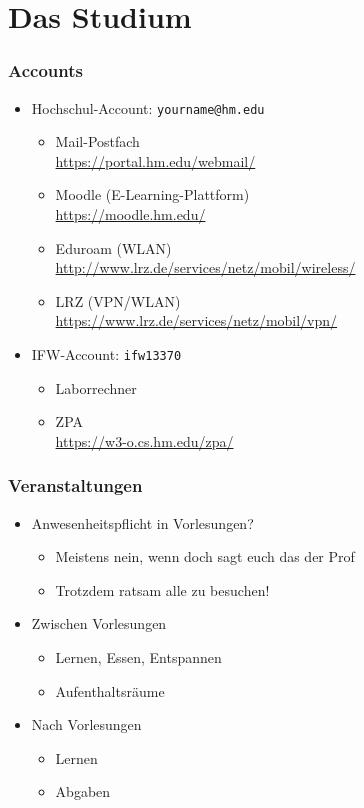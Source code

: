 \documentclass{beamer}
\begin{document}
\section{Das Studium}
\begin{frame}
\frametitle{Accounts}

\begin{itemize}
	\item Hochschul-Account: \texttt{yourname@hm.edu}
		\begin{itemize}
			\item Mail-Postfach\\
				\footnotesize\url{https://portal.hm.edu/webmail/}\small
			\pause
			\item Moodle (E-Learning-Plattform)\\
				\footnotesize\url{https://moodle.hm.edu/}\small
			\pause
			\item Eduroam (WLAN)\\
				\footnotesize\url{http://www.lrz.de/services/netz/mobil/wireless/}\small
			\pause
			\item LRZ (VPN/WLAN)\\
				\footnotesize\url{https://www.lrz.de/services/netz/mobil/vpn/}\small
		\end{itemize}
	\pause
	\item IFW-Account: \texttt{ifw13370}
		\begin{itemize}
			\item Laborrechner
			\pause
			\item ZPA\\
				\footnotesize\url{https://w3-o.cs.hm.edu/zpa/}\small
		\end{itemize}
\end{itemize}
\end{frame}


\begin{frame}
\frametitle{Veranstaltungen}
\begin{itemize}
	\item Anwesenheitspflicht in Vorlesungen?
		\begin{itemize}
			\item Meistens nein, wenn doch sagt euch das der Prof
			\item Trotzdem ratsam alle zu besuchen!
		\end{itemize}
	\pause
	\item Zwischen Vorlesungen
		\begin{itemize}
			\item Lernen, Essen, Entspannen
			\item Aufenthaltsräume
		\end{itemize}
	\pause
	\item Nach Vorlesungen
		\begin{itemize}
			\item Lernen
			\item Abgaben
		\end{itemize}
\end{itemize}
\end{frame}
\end{document}
